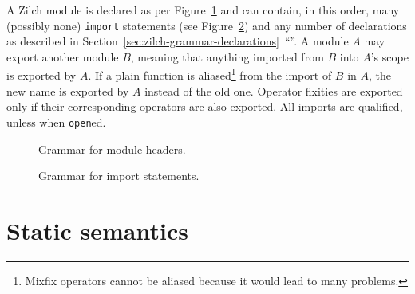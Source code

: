 A Zilch module is declared as per Figure~\ref{fig:zilch-grammar-modules-headergrammar} and can contain, in this order, many (possibly none) \texttt{import} statements (see Figure~\ref{fig:zilch-grammar-modules-importgrammar}) and any number of declarations as described in Section~\ref{sec:zilch-grammar-declarations}~``''.
A module $A$ may export another module $B$, meaning that anything imported from $B$ into $A$'s scope is exported by $A$.
If a plain function is aliased\footnote{Mixfix operators cannot be aliased because it would lead to many problems.} from the import of $B$ in $A$, the new name is exported by $A$ instead of the old one.
Operator fixities are exported only if their corresponding operators are also exported.
All imports are qualified, unless when \verb|open|ed.

\begin{figure}[H]
  \centering


  \caption{Grammar for module headers.}
  \label{fig:zilch-grammar-modules-headergrammar}
\end{figure}

\begin{figure}[H]
  \centering


  \caption{Grammar for import statements.}
  \label{fig:zilch-grammar-modules-importgrammar}
\end{figure}

\chapter{Static semantics}\label{chap:zilch-staticsem}
